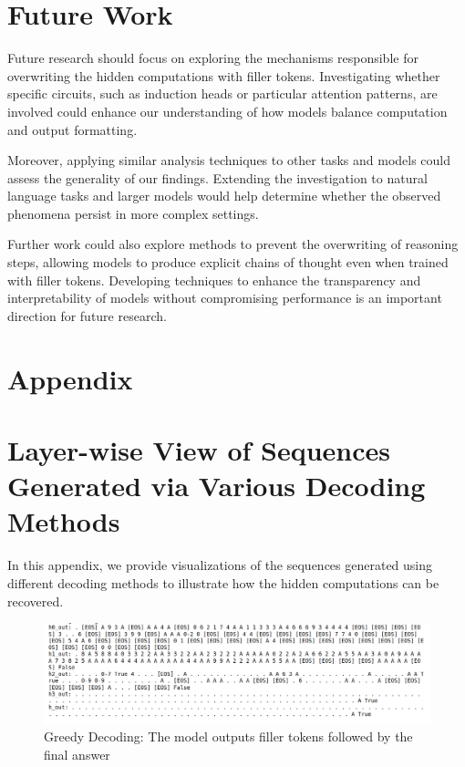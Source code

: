 \documentclass{article}
\begin{document}
\section{Future Work}

Future research should focus on exploring the mechanisms responsible for overwriting the hidden computations with filler tokens. Investigating whether specific circuits, such as induction heads or particular attention patterns, are involved could enhance our understanding of how models balance computation and output formatting.

Moreover, applying similar analysis techniques to other tasks and models could assess the generality of our findings. Extending the investigation to natural language tasks and larger models would help determine whether the observed phenomena persist in more complex settings.

Further work could also explore methods to prevent the overwriting of reasoning steps, allowing models to produce explicit chains of thought even when trained with filler tokens. Developing techniques to enhance the transparency and interpretability of models without compromising performance is an important direction for future research.

\clearpage
\section*{Appendix}

\section{Layer-wise View of Sequences Generated via Various Decoding Methods}

In this appendix, we provide visualizations of the sequences generated using different decoding methods to illustrate how the hidden computations can be recovered.

\begin{figure}[H]
    \centering
    \includegraphics[width=\textwidth]{greedy_decoding.png}
    \caption{Greedy Decoding: The model outputs filler tokens followed by the final answer}
    \label{fig:greedy}
\end{figure}
\end{document}
